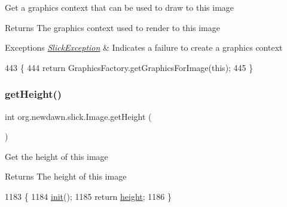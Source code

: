 Get a graphics context that can be used to draw to this image

\begin{DoxyReturn}{Returns}
The graphics context used to render to this image 
\end{DoxyReturn}

\begin{DoxyExceptions}{Exceptions}
{\em \mbox{\hyperlink{classorg_1_1newdawn_1_1slick_1_1_slick_exception}{Slick\+Exception}}} & Indicates a failure to create a graphics context \\
\hline
\end{DoxyExceptions}

\begin{DoxyCode}
443                                                         \{
444         \textcolor{keywordflow}{return} GraphicsFactory.getGraphicsForImage(\textcolor{keyword}{this});
445     \}
\end{DoxyCode}
\mbox{\label{classorg_1_1newdawn_1_1slick_1_1_image_aa2594a93f5126f60ad8a72444fceee98}} 
\subsubsection{\texorpdfstring{get\+Height()}{getHeight()}}
{\footnotesize\ttfamily int org.\+newdawn.\+slick.\+Image.\+get\+Height (\begin{DoxyParamCaption}{ }\end{DoxyParamCaption})\hspace{0.3cm}{\ttfamily [inline]}}

Get the height of this image

\begin{DoxyReturn}{Returns}
The height of this image 
\end{DoxyReturn}

\begin{DoxyCode}
1183                            \{
1184         \mbox{\hyperlink{classorg_1_1newdawn_1_1slick_1_1_image_a94d180c9218ba1444a0496a1898ec345}{init}}();
1185         \textcolor{keywordflow}{return} \mbox{\hyperlink{classorg_1_1newdawn_1_1slick_1_1_image_a54397a37823bc59ddc79ec70dc5cf226}{height}};
1186     \}
\end{DoxyCode}
\mbox{\label{classorg_1_1newdawn_1_1slick_1_1_image_a3d7329c13259ffebd9efc30deb5655fc}} 
